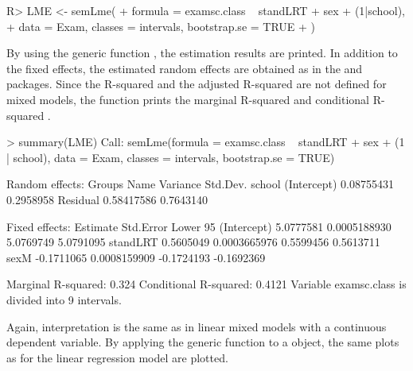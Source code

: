 \begin{example}
R> LME <- semLme(
+    formula = examsc.class ~ standLRT + sex + (1|school), 
+    data = Exam, classes = intervals, bootstrap.se = TRUE
+  )
\end{example}

By using the generic function , the estimation results are printed. In addition to the fixed effects, the estimated random effects are obtained as in the  and  packages. Since the R-squared and the adjusted R-squared are not defined for mixed models, the  function prints the marginal R-squared and conditional R-squared \citep{Nak13, Joh14}. 

\begin{example}
> summary(LME)
Call:
semLme(formula = examsc.class ~ standLRT + sex + (1 | school), 
    data = Exam, classes = intervals, bootstrap.se = TRUE)
    
Random effects:
    Groups        Name   Variance  Std.Dev.
    school (Intercept) 0.08755431 0.2958958
  Residual             0.58417586 0.7643140

Fixed effects:
             Estimate    Std.Error Lower 95%
(Intercept) 5.0777581 0.0005188930       5.0769749       5.0791095
standLRT    0.5605049 0.0003665976       0.5599456       0.5613711
sexM       -0.1711065 0.0008159909      -0.1724193      -0.1692369

Marginal R-squared: 0.324 Conditional R-squared: 0.4121
Variable examsc.class is divided into 9 intervals.
\end{example}

Again, interpretation is the same as in linear mixed models with a continuous dependent variable. By applying the generic function  to a  object, the same  plots as for the linear regression model are plotted.

